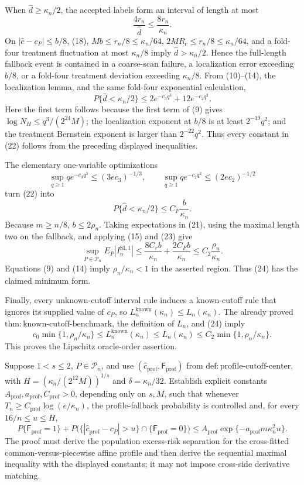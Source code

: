 When \(\widehat d\ge\kappa_n/2\), the accepted labels form an interval
of length at most
\[
 \frac{4r_n}{\widehat d}\le\frac{8r_n}{\kappa_n}. \tag{21}
\]
On \(|\widehat c-c_P|\le b/8\), (18),
\(Mb\le r_n/8\le\kappa_n/64\),
\(2MR_c\le r_n/8\le\kappa_n/64\), and a fold-four treatment
fluctuation at most \(\kappa_n/8\) imply
\(\widehat d>\kappa_n/2\).  Hence the full-length fallback event is
contained in a coarse-scan failure, a localization error exceeding
\(b/8\), or a fold-four treatment deviation exceeding
\(\kappa_n/8\).  From (10)--(14), the localization lemma, and the same
fold-four exponential calculation,
\[
 P\{\widehat d<\kappa_n/2\}
 \le2e^{-c_3q^3}+12e^{-c_2q^2}. \tag{22}
\]
Here the first term follows because the first term of (9) gives
\(\log N_H\le q^3/(2^{24}M)\); the localization exponent at \(b/8\)
is at least \(2^{-19}q^2\); and the treatment Bernstein exponent is
larger than \(2^{-22}q^2\).  Thus every constant in (22) follows from
the preceding displayed inequalities.

The elementary one-variable optimizations
\[
 \sup_{q\ge1}qe^{-c_3q^3}\le(3ec_3)^{-1/3},
 \qquad
 \sup_{q\ge1}qe^{-c_2q^2}\le(2ec_2)^{-1/2}
\]
turn (22) into
\[
 P\{\widehat d<\kappa_n/2\}
 \le C_F\frac{b}{\kappa_n}. \tag{23}
\]
Because \(m\ge n/8\), \(b\le2\rho_n\).  Taking expectations in
(21), using the maximal length two on the fallback, and applying
(15) and (23) give
\[
 \sup_{P\in\mathcal P_n}E_P|I_n^{\mathrm{SI},1}|
 \le\frac{8C_rb}{\kappa_n}+\frac{2C_Fb}{\kappa_n}
 \le C_2\frac{\rho_n}{\kappa_n}. \tag{24}
\]
Equations (9) and (14) imply \(\rho_n/\kappa_n<1\) in the asserted
region.  Thus (24) has the claimed minimum form.

Finally, every unknown-cutoff interval rule induces a known-cutoff rule
that ignores its supplied value of \(c_P\), so
\(L_n^{\mathrm{known}}(\kappa_n)\le L_n(\kappa_n)\).  The already
proved \(\mathrm{thm:known\mbox{-}cutoff\mbox{-}benchmark}\), the
definition of \(L_n\), and (24) imply
\[
 c_0\min\{1,\rho_n/\kappa_n\}
 \le L_n^{\mathrm{known}}(\kappa_n)
 \le L_n(\kappa_n)
 \le C_2\min\{1,\rho_n/\kappa_n\}.
\]
This proves the Lipschitz oracle-order assertion.

Suppose \(1<s\le2\), \(P\in\mathcal P_n\), and use
\((\widehat c_{\mathrm{prof}},\mathsf F_{\mathrm{prof}})\) from
\(\mathrm{def:profile\mbox{-}cutoff\mbox{-}center}\), with
\(H=(\kappa_n/(2^{12}M))^{1/s}\) and \(\delta=\kappa_n/32\).
Establish explicit constants \(A_{\mathrm{prof}},a_{\mathrm{prof}},
C_{\mathrm{prof}}>0\), depending only on \(s,M\), such that whenever
\(T_n\ge C_{\mathrm{prof}}\log(e/\kappa_n)\), the profile-fallback
probability is controlled and, for every \(16/n\le u\le H\),
\[
 P\{\mathsf F_{\mathrm{prof}}=1\}
 +P\bigl(\{|\widehat c_{\mathrm{prof}}-c_P|>u\}
          \cap\{\mathsf F_{\mathrm{prof}}=0\}\bigr)
 \le A_{\mathrm{prof}}
       \exp\{-a_{\mathrm{prof}}m\kappa_n^2u\}.
\]
The proof must derive the population excess-risk separation for the
cross-fitted common-versus-piecewise affine profile and then derive the
sequential maximal inequality with the displayed constants; it may not
impose cross-side derivative matching.

